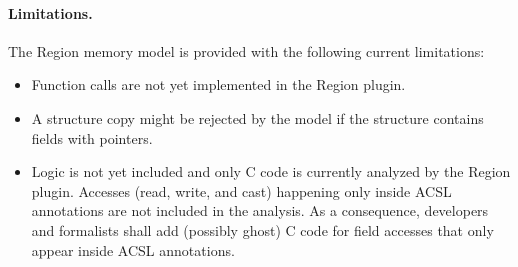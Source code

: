 \paragraph{Limitations.} The Region memory model is provided with the
following current limitations:
\begin{itemize}
    \item Function calls are not yet implemented in the Region plugin.
    \item A structure copy might be rejected by the model if the structure
    contains fields with pointers.
    \item Logic is not yet included and only C code is currently analyzed by
    the Region plugin. Accesses (read, write, and cast) happening only inside
    ACSL annotations are not included in the analysis. As a consequence,
    developers and formalists shall add (possibly ghost) C code for field
    accesses that only appear inside ACSL annotations.
\end{itemize}
